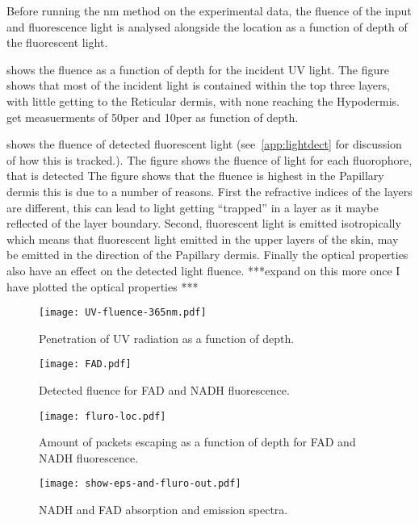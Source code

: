 Before running the \gls{nm} method on the experimental data, the fluence of the input and fluorescence light is analysed alongside the location as a function of depth of the fluorescent light.

 shows the fluence as a function of depth for the incident UV light.
The figure shows that most of the incident light is contained within the top three layers, with little getting to the Reticular dermis, with none reaching the Hypodermis.
get measuerments of 50per and 10per as function of depth.

 shows the fluence of detected fluorescent light (see~\cref{app:lightdect} for discussion of how this is tracked.).
The figure shows the fluence of light for each fluorophore, that is detected 
The figure shows that the fluence is highest in the Papillary dermis this is due to a number of reasons.
First the refractive indices of the layers are different, this can lead to light getting ``trapped'' in a layer as it maybe reflected of the layer boundary.
Second, fluorescent light is emitted isotropically which means that fluorescent light emitted in the upper layers of the skin, may be emitted in the direction of the Papillary dermis.
Finally the optical properties also have an effect on the detected light fluence.
***expand on this more once I have plotted the optical properties ***

\begin{figure}[!htpb]
    \centering
    \texttt{[image: UV-fluence-365nm.pdf]}
    \caption{Penetration of UV radiation as a function of depth.}
    \label{fig:uvpen}
\end{figure}

\begin{figure}[!htpb]
    \centering
    \texttt{[image: FAD.pdf]}
    \caption{Detected fluence for FAD and NADH fluorescence.}
    \label{fig:fadnadhboth}
\end{figure}

\begin{figure}[!htpb]
    \centering
    \texttt{[image: fluro-loc.pdf]}
    \caption{Amount of packets escaping as a function of depth for FAD and NADH fluorescence.}
    \label{fig:floc}
\end{figure}

\begin{figure}[!htpb]
    \centering
    \texttt{[image: show-eps-and-fluro-out.pdf]}
    \caption{NADH and FAD absorption and emission spectra.}
    \label{fig:epsfluro}
\end{figure}

